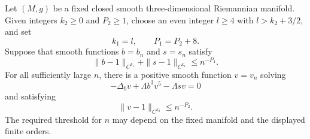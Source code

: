 \begin{lemma}
\label{lem:exact-positive-factor}
Let \((M,g)\) be a fixed closed smooth three-dimensional Riemannian
manifold.  Given integers \(k_2\ge0\) and \(P_2\ge1\), choose an
even integer \(l\ge4\) with \(l>k_2+3/2\), and set
\[
 k_1=l,\qquad P_1=P_2+8.
\]
Suppose that smooth functions \(b=b_n\) and \(s=s_n\) satisfy
\begin{equation}
 \|b-1\|_{C^{k_1}}+\|s-1\|_{C^{k_1}}
 \le n^{-P_1}.
 \label{eq:exact-coefficient-smallness}
\end{equation}
For all sufficiently large \(n\), there is a positive smooth function
\(v=v_n\) solving
\begin{equation}
 -\Delta_bv+\Lambda b^3v^5-\Lambda sv=0
 \label{eq:exact-semilinear}
\end{equation}
and satisfying
\begin{equation}
 \|v-1\|_{C^{k_2}}\le n^{-P_2}.
 \label{eq:exact-factor-bound}
\end{equation}
The required threshold for \(n\) may depend on the fixed manifold and
the displayed finite orders.
\end{lemma}

